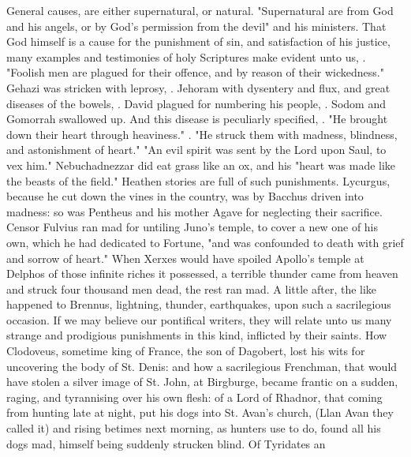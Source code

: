 General causes, are either supernatural, or natural. "Supernatural are from God
and his angels, or by God's permission from the devil" and his ministers. That
God himself is a cause for the punishment of sin, and satisfaction of his
justice, many examples and testimonies of holy Scriptures make evident unto us,
. "Foolish men are plagued for their offence, and by
reason of their wickedness." Gehazi was stricken with leprosy, . Jehoram with dysentery and flux, and great diseases of the bowels,
. David plagued for numbering his people,
. Sodom and Gomorrah swallowed up. And this disease is
peculiarly specified, . "He brought down their
heart through heaviness." . "He struck them with
madness, blindness, and astonishment of heart." "An evil
spirit was sent by the Lord upon Saul, to vex him."
Nebuchadnezzar did eat grass like an ox, and his "heart
was made like the beasts of the field." Heathen stories are full of such
punishments. Lycurgus, because he cut down the vines in the country, was by
Bacchus driven into madness: so was Pentheus and his mother Agave for
neglecting their sacrifice. Censor Fulvius ran mad for
untiling Juno's temple, to cover a new one of his own, which he had dedicated
to Fortune, "and was confounded to death with grief and
sorrow of heart." When Xerxes would have spoiled Apollo's
temple at Delphos of those infinite riches it possessed, a terrible thunder
came from heaven and struck four thousand men dead, the rest ran mad.
A little after, the like happened to Brennus, lightning,
thunder, earthquakes, upon such a sacrilegious occasion. If we may believe our
pontifical writers, they will relate unto us many strange and prodigious
punishments in this kind, inflicted by their saints. How
Clodoveus, sometime king of France, the son of Dagobert,
lost his wits for uncovering the body of St. Denis: and how a
sacrilegious Frenchman, that would have stolen a silver
image of St. John, at Birgburge, became frantic on a sudden, raging, and
tyrannising over his own flesh: of a Lord of Rhadnor, that
coming from hunting late at night, put his dogs into St. Avan's church, (Llan
Avan they called it) and rising betimes next morning, as hunters use to do,
found all his dogs mad, himself being suddenly strucken blind. Of Tyridates an
